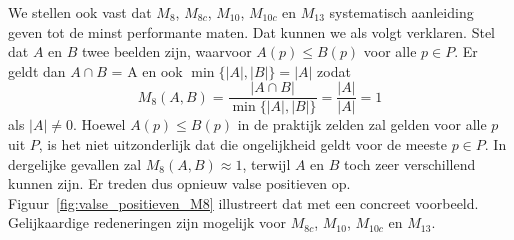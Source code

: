 We stellen ook vast dat $M_8$, $M_{8c}$, $M_{10}$, $M_{10c}$ en $M_{13}$ systematisch aanleiding
geven tot de minst performante maten. Dat kunnen we als volgt verklaren. Stel dat $A$ en $B$
twee beelden zijn, waarvoor $A(p) \le B(p)$ voor alle
$p \in P$. Er geldt dan $A \cap B$ = A en ook $\min\{|A|,|B|\}=|A|$ zodat
\begin{displaymath}
M_8(A,B)= \frac{|A \cap B|}{\min\{|A|,|B|\}} = \frac{|A|}{|A|} = 1
\end{displaymath}
als $|A| \ne 0$. Hoewel $A(p) \le B(p)$ in de praktijk zelden zal gelden voor alle $p$ uit $P$, 
is het niet uitzonderlijk dat die ongelijkheid geldt voor de meeste $p \in P$. In dergelijke 
gevallen zal $M_8(A,B) \approx 1$, terwijl $A$ en $B$ toch 
zeer verschillend kunnen zijn. Er treden dus opnieuw valse positieven op. Figuur~\ref{fig:valse_positieven_M8}
illustreert dat met een concreet voorbeeld. Gelijkaardige redeneringen zijn mogelijk voor $M_{8c}$, $M_{10}$, 
$M_{10c}$ en $M_{13}$.


